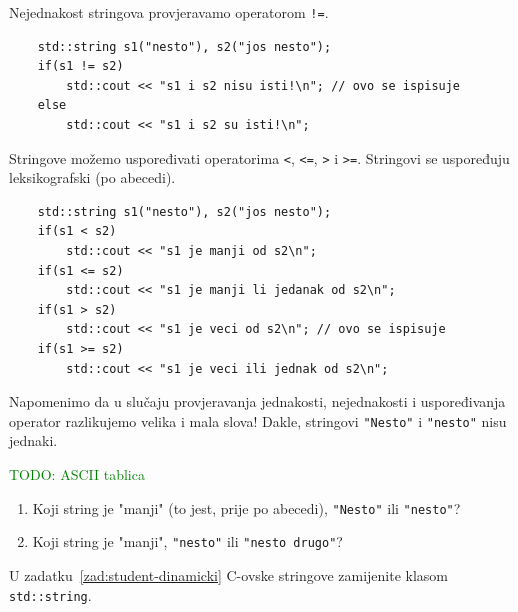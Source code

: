 Nejednakost stringova provjeravamo operatorom \texttt{!=}.
\begin{verbatim}
    std::string s1("nesto"), s2("jos nesto");
    if(s1 != s2)
        std::cout << "s1 i s2 nisu isti!\n"; // ovo se ispisuje
    else
        std::cout << "s1 i s2 su isti!\n"; 
\end{verbatim}

Stringove možemo uspoređivati operatorima \texttt{<}, \texttt{<=}, \texttt{>} i \texttt{>=}. Stringovi se uspoređuju leksikografski (po abecedi).

\begin{verbatim}
    std::string s1("nesto"), s2("jos nesto");
    if(s1 < s2)
        std::cout << "s1 je manji od s2\n";
    if(s1 <= s2)
        std::cout << "s1 je manji li jedanak od s2\n";
    if(s1 > s2)
        std::cout << "s1 je veci od s2\n"; // ovo se ispisuje
    if(s1 >= s2)
        std::cout << "s1 je veci ili jednak od s2\n";
\end{verbatim}

Napomenimo da u slučaju provjeravanja jednakosti, nejednakosti i uspoređivanja operator razlikujemo velika i mala slova! Dakle, stringovi \texttt{"Nesto"} i \texttt{"nesto"} nisu jednaki.

\textcolor{green}{TODO: ASCII tablica}

\begin{razmisljanje}
    \begin{enumerate}
        \item Koji string je "manji" (to jest, prije po abecedi), \texttt{"Nesto"} ili \texttt{"nesto"}?
        \item Koji string je "manji", \texttt{"nesto"} ili \texttt{"nesto drugo"}?
    \end{enumerate}
\end{razmisljanje}

\medskip

\begin{zadatak}
    U zadatku~\ref{zad:student-dinamicki} C-ovske stringove zamijenite klasom \texttt{std::string}.
\end{zadatak}

